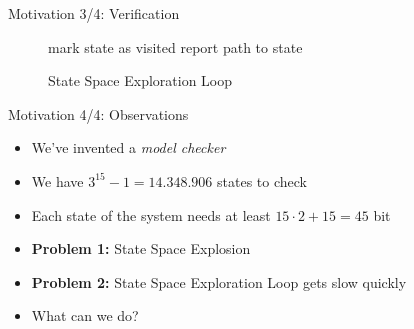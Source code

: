 \documentclass[aspectratio=169]{beamer}
\begin{document}
\begin{frame}{Motivation 3/4: Verification}
    \begin{figure}
        \centering
        \begin{minipage}{.7\linewidth}
            \begin{algorithmic}
                \State mark state as visited
                \State report path to state
                \EndIf
                \EndWhile
            \end{algorithmic}
        \end{minipage}
        \vspace{\baselineskip}
        \caption{State Space Exploration Loop}
        \label{fig:state-space-exploration-loop}
    \end{figure}
\end{frame}

\begin{frame}{Motivation 4/4: Observations}
    \begin{itemize}
        \item We've invented a \emph{model checker}
        \item We have $3^{15}-1=14.348.906$ states to check
        \item Each state of the system needs at least $15\cdot2+15=45$ bit
        \item \textbf{Problem 1:} State Space Explosion
        \item \textbf{Problem 2:} State Space Exploration Loop gets slow quickly
        \item What can we do?
    \end{itemize}
\end{frame}


\end{document}
